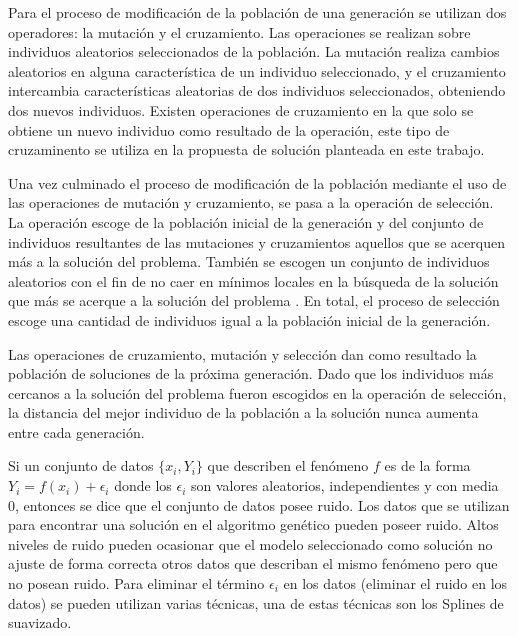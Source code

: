 Para el proceso de modificación de la población de una generación se utilizan dos operadores: la mutación y el cruzamiento. Las operaciones se realizan sobre individuos aleatorios seleccionados de la población. La mutación realiza cambios aleatorios en alguna característica de un individuo seleccionado, y el cruzamiento intercambia características aleatorias de dos individuos seleccionados, obteniendo dos nuevos individuos. Existen operaciones de cruzamiento en la que solo se obtiene un nuevo individuo como resultado de la operación, este tipo de cruzaminento se utiliza en la propuesta de solución planteada en este trabajo.

Una vez culminado el proceso de modificación de la población mediante el uso de las operaciones de mutación y cruzamiento, se pasa a la operación de selección. La operación escoge de la población inicial de la generación y del conjunto de individuos resultantes de las mutaciones y cruzamientos aquellos que se acerquen más a la solución del problema. También se escogen un conjunto de individuos aleatorios con el fin de no caer en mínimos locales en la búsqueda de la solución que más se acerque a la solución del problema \cite{mitchell1998introduction}. En total, el proceso de selección escoge una cantidad de individuos igual a la población inicial de la generación.

Las operaciones de cruzamiento, mutación y selección dan como resultado la población de soluciones de la próxima generación. Dado que los individuos más cercanos a la solución del problema fueron escogidos en la operación de selección, la distancia del mejor individuo de la población a la solución nunca aumenta entre cada generación.


Si un conjunto de datos $\{x_i, Y_i\}$ que describen el fenómeno $f$ es de la forma $Y_i = f(x_i) + \epsilon _i$ donde los $\epsilon _i$ son valores aleatorios, independientes y con media 0, entonces se dice que el conjunto de datos posee ruido. Los datos que se utilizan para encontrar una solución en el algoritmo genético pueden poseer ruido. Altos niveles de ruido pueden ocasionar que el modelo seleccionado como solución no ajuste de forma correcta otros datos que describan el mismo fenómeno pero que no posean ruido. Para eliminar el término $\epsilon _i$ en los datos (eliminar el ruido en los datos) se pueden utilizan varias técnicas, una de estas técnicas son los Splines de suavizado.

